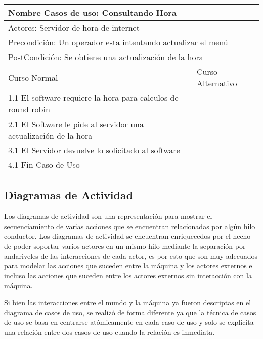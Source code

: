 \documentclass[a4paper,10pt]{article}
\begin{document}
\bigskip

\begin{center}
\begin{tabularx}{14cm}{|X|X|}
\hline
\multicolumn{2}{|l|}{Nombre Casos de uso: Consultando Hora}\\
\hline
\multicolumn{2}{|l|}{Actores: Servidor de hora de internet}\\
\hline
\multicolumn{2}{|l|}{Precondici\'on: Un operador esta intentando actualizar el men\'u}\\
\hline
\multicolumn{2}{|l|}{PostCondici\'on: Se obtiene una actualizaci\'on de la hora}\\
\hline
Curso Normal & Curso Alternativo\\
\hline
1.1 El software requiere la hora para calculos de round robin & 
\\
\hline
2.1 El Software le pide al servidor una actualizaci\'on de la hora & 
\\
\hline
3.1 El Servidor devuelve lo solicitado al software &
\\
\hline
4.1 Fin Caso de Uso &
\\
\hline
\end{tabularx}
\end{center}



\subsection*{Diagramas de Actividad}


Los diagramas de actividad son una representaci\'on para mostrar el secuenciamiento de varias acciones que se encuentran relacionadas por alg\'un
hilo conductor. Los diagramas de actividad se encuentran enriquecedos por el hecho de poder soportar varios actores en un mismo hilo mediante la 
separaci\'on por andariveles de las interacciones de cada actor, es por esto que son muy adecuados para modelar las acciones que suceden entre la
m\'aquina y los actores externos e incluso las acciones que suceden entre los actores externos sin interacci\'on con la m\'aquina.

Si bien las interacciones entre el mundo y la m\'aquina ya fueron descriptas en el diagrama de casos de uso, se realiz\'o de forma diferente
ya que la t\'ecnica de casos de uso se basa en centrarse at\'omicamente en cada caso de uso y solo se explicita una relaci\'on entre dos casos de
uso cuando la relaci\'on es inmediata.
\end{document}
